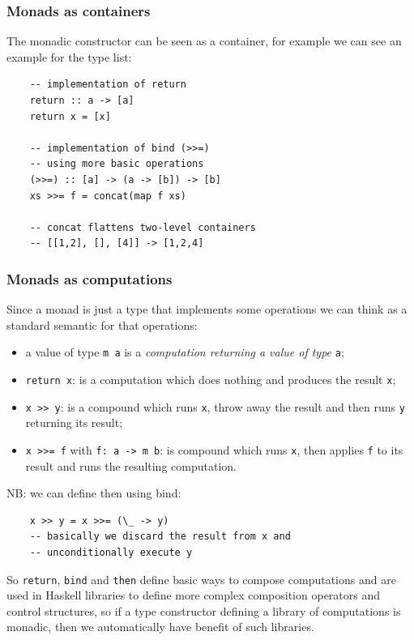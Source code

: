 \subsubsection{Monads as containers}
The monadic constructor can be seen as a container, for example we can see an example for the type list:
\begin{verbatim}
    -- implementation of return
    return :: a -> [a]
    return x = [x]

    -- implementation of bind (>>=)
    -- using more basic operations
    (>>=) :: [a] -> (a -> [b]) -> [b]
    xs >>= f = concat(map f xs)

    -- concat flattens two-level containers
    -- [[1,2], [], [4]] -> [1,2,4]
\end{verbatim}


\subsubsection{Monads as computations}
Since a monad is just a type that implements some operations we can think as a standard semantic for that operations:
\begin{itemize}
    \item a value of type \verb|m a| is a \emph{computation returning a value of type} \verb|a|;

    \item \verb|return x|: is a computation which does nothing and produces the result \verb|x|;

    \item \verb|x >> y|: is a compound which runs \verb|x|, throw away the result and then runs \verb|y| returning its result;

    \item \verb|x >>= f| with \verb|f: a -> m b|: is compound which runs \verb|x|, then applies \verb|f| to its result and runs the resulting computation.
\end{itemize}

NB: we can define then using bind:
\begin{verbatim}
    x >> y = x >>= (\_ -> y)
    -- basically we discard the result from x and 
    -- unconditionally execute y
\end{verbatim}

So \verb|return|, \verb|bind| and \verb|then| define basic ways to compose computations and are used in Haskell libraries to define more complex composition operators and control structures, so if a type constructor defining a library of computations is monadic, then we automatically have benefit of such libraries.

